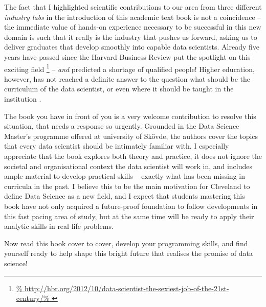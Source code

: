 \documentclass[12pt]{article}
\begin{document}
The fact that I highlighted scientific contributions to our area from three different \emph{industry labs} in the introduction of this academic text book is not a coincidence -- the immediate value of hands-on experience necessary to be successful in this new domain is such that it really is the industry that pushes us forward, asking us to deliver graduates that develop smoothly into capable data scientists.
Already five years have passed since the Harvard Business Review put the spotlight on this exciting field%
\footnote{\url{%
http://hbr.org/2012/10/data-scientist-the-sexiest-job-of-the-21st-century/%
}} 
 -- \emph{and} predicted a shortage of qualified people! Higher education, however, has not reached a definite answer to the question what should be the curriculum of the data scientist, or even where it should be taught in the institution \cite{DBLP:journals/cacm/BermanRHCDEFMRS18}.

The book you have in front of you is a very welcome contribution to resolve this situation, that needs a response so urgently. Grounded in the Data Science Master's programme offered at university of Sk\"ovde, the authors cover the topics that every data scientist should be intimately familiar with. I especially appreciate that the book explores both theory and practice, it does not ignore the societal and organisational context the data scientist will work in, and includes ample material to develop practical skills -- exactly what has been missing in curricula in the past. I believe this to be the main motivation for Cleveland to define Data Science as a new field, and I expect that students mastering this book have not only acquired a future-proof foundation to follow developments in this fast pacing area of study, but at the same time will be ready to apply their analytic skills in real life problems.

Now read this book cover to cover, develop your programming skills, and find yourself ready to help shape this bright future that realises the promise of data science!



\end{document}
